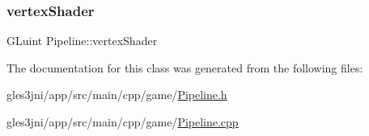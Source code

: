 \subsubsection{\texorpdfstring{vertex\+Shader}{vertexShader}}
{\footnotesize\ttfamily G\+Luint Pipeline\+::vertex\+Shader\hspace{0.3cm}{\ttfamily [private]}}



The documentation for this class was generated from the following files\+:\begin{DoxyCompactItemize}
\item 
gles3jni/app/src/main/cpp/game/\hyperlink{_pipeline_8h}{Pipeline.\+h}\item 
gles3jni/app/src/main/cpp/game/\hyperlink{_pipeline_8cpp}{Pipeline.\+cpp}\end{DoxyCompactItemize}
